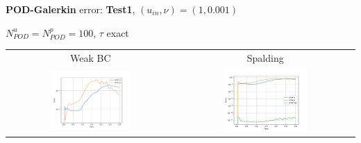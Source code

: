 \documentclass[9pt,compress,t,aspectratio=169]{beamer}
\newcommand{\1}{\begin{pmatrix}
		1\\
		1
\end{pmatrix}}
\newcommand{\highlight}[1]{\textbf{\color{bluemathlab}#1}}
\newcommand{\highlightB}[1]{\textbf{\color{black!15!orangemathlab}#1}}
\begin{document}
\begin{frame}{\highlight{POD-Galerkin} error: \highlightB{Test1}, $(u_{in},\nu)=(1,0.001)$}
	\begin{center}
		$N_{POD}^u=N_{POD}^p=100$, $\tau$ exact
		\begin{tabular}{cc}
			Weak BC& Spalding\\
			\includegraphics[width=0.49\textwidth]{figures/cylinder_weak_errors_RB_vs_time.pdf}&
			\includegraphics[width=0.49\textwidth]{figures/cylinder_spalding_errors_RB_vs_time.pdf}
		\end{tabular}
	\end{center}
\end{frame}
\end{document}
